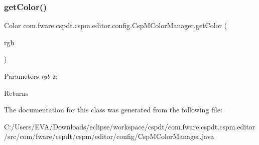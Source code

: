 \subsubsection{\texorpdfstring{get\+Color()}{getColor()}}
{\footnotesize\ttfamily Color com.\+fware.\+cspdt.\+cspm.\+editor.\+config.\+Csp\+M\+Color\+Manager.\+get\+Color (\begin{DoxyParamCaption}\item[{R\+GB}]{rgb }\end{DoxyParamCaption})\hspace{0.3cm}{\ttfamily [inline]}}


\begin{DoxyParams}{Parameters}
{\em rgb} & \\
\hline
\end{DoxyParams}
\begin{DoxyReturn}{Returns}

\end{DoxyReturn}


The documentation for this class was generated from the following file\+:\begin{DoxyCompactItemize}
\item 
C\+:/\+Users/\+E\+V\+A/\+Downloads/eclipse/workspace/cspdt/com.\+fware.\+cspdt.\+cspm.\+editor/src/com/fware/cspdt/cspm/editor/config/Csp\+M\+Color\+Manager.\+java\end{DoxyCompactItemize}
